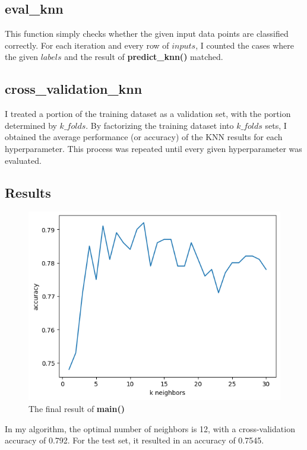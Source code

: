 \documentclass[12pt]{article}
\begin{document}
\subsection{eval\_knn}

This function simply checks whether the given input data points are classified correctly. For each iteration and every row of $inputs$, I counted the cases where the given $labels$ and the result of \textbf{predict\_knn()} matched.

\subsection{cross\_validation\_knn}

I treated a portion of the training dataset as a validation set, with the portion determined by $k\_folds$. By factorizing the training dataset into $k\_folds$ sets, I obtained the average performance (or accuracy) of the KNN results for each hyperparameter. This process was repeated until every given hyperparameter was evaluated.

\subsection{Results}

\begin{figure}[!h]
    \centering
    \includegraphics[scale=0.5]{./figures/output.png}
    \caption{The final result of \textbf{main()}}
\end{figure}

In my algorithm, the optimal number of neighbors is 12, with a cross-validation accuracy of 0.792. For the test set, it resulted in an accuracy of 0.7545.
\end{document}
